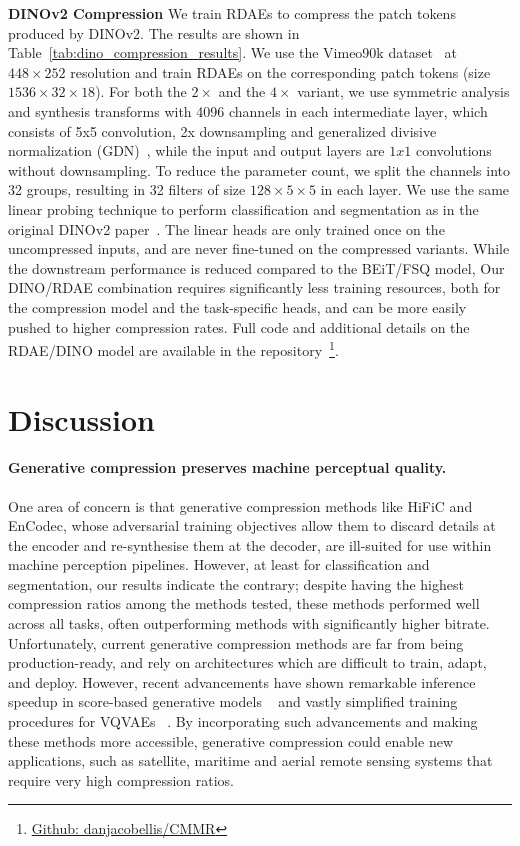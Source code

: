 \documentclass[10pt,twocolumn,letterpaper]{article}
\begin{document}
\textbf{DINOv2 Compression} We train RDAEs to compress the patch tokens produced by DINOv2. The results are shown in Table~\ref{tab:dino_compression_results}. We use the Vimeo90k dataset~\cite{xue2019video} at $448\times252$ resolution and train RDAEs on the corresponding patch tokens (size $1536\times32\times18$). For both the $2\times$ and the $4\times$ variant, we use symmetric analysis and synthesis transforms with 4096 channels in each intermediate layer, which consists of 5x5 convolution, 2x downsampling and generalized divisive normalization (GDN)~\cite{johnston2019computationally}, while the input and 
output layers are $1x1$ convolutions without downsampling. To reduce the parameter count, we split the channels into 32 groups, resulting in 32 filters of size $128\times5\times5$ in each layer. We use the same linear probing technique to perform classification and segmentation as in the original DINOv2 paper~\cite{oquab2023dinov2}. The linear heads are only trained once on the uncompressed inputs, and are never fine-tuned on the compressed variants.  While the downstream performance is reduced compared to the BEiT/FSQ model, Our DINO/RDAE combination requires significantly less training resources, both for the compression model and the task-specific heads, and can be more easily pushed to higher compression rates. Full code and additional details on the RDAE/DINO model are available in the repository~\footnote{\href{https://github.com/danjacobellis/CMMR}{Github: danjacobellis/CMMR}}.

\section{Discussion}

\paragraph{Generative compression preserves machine perceptual quality.} One area of concern is that generative compression methods like HiFiC and EnCodec, whose adversarial training objectives allow them to discard details at the encoder and re-synthesise them at the decoder, are ill-suited for use within machine perception pipelines. However, at least for classification and segmentation, our results indicate the contrary; despite having the highest compression ratios among the methods tested, these methods performed well across all tasks, often outperforming methods with significantly higher bitrate. Unfortunately, current generative compression methods are far from being production-ready, and rely on architectures which are difficult to train, adapt, and deploy. However, recent advancements have shown remarkable inference speedup in score-based generative models ~\cite{song2023consistency} and vastly simplified training procedures for VQVAEs ~\cite{mentzer2023finite}. By incorporating such advancements and making these methods more accessible, generative compression could enable new applications, such as satellite, maritime and aerial remote sensing systems that require very high compression ratios.
\end{document}
